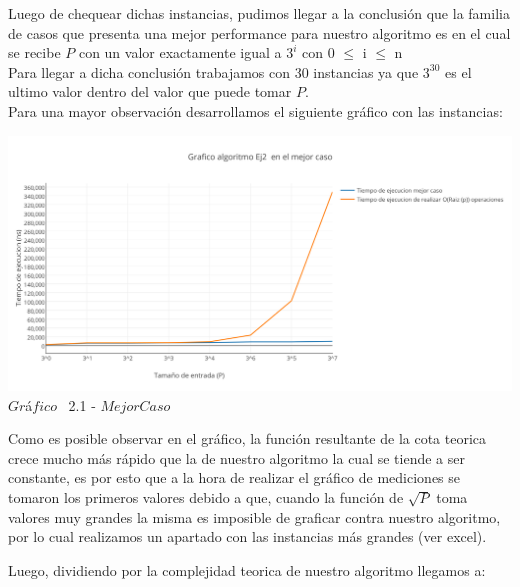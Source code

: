 Luego de chequear dichas instancias, pudimos llegar a la conclusi\'on que la familia de casos que presenta una mejor performance para nuestro algoritmo
es en el cual se recibe $P$ con un valor exactamente igual a $3^i$ con 0 $\leq$ i $\leq$ n \\

Para llegar a dicha conclusi\'on trabajamos con 30 instancias ya que $3^{30}$ es el ultimo valor dentro del valor que puede tomar $P$.\\

Para una mayor observaci\'on desarrollamos el siguiente gr\'afico con las instancias:\\

\vspace*{0.3cm} \vspace*{0.3cm}
  \begin{center}
 \includegraphics[scale=0.65]{./EJ2/mejorcaso.png}
 {$Gr$\'a$fico$ \ 2.1 - $Mejor Caso$}
  \end{center}
  \vspace*{0.3cm}
  
Como es posible observar en el gr\'afico, la funci\'on resultante de la cota teorica crece mucho m\'as r\'apido que la de nuestro algoritmo la cual se tiende a ser constante, es por esto que a la hora de realizar el gr\'afico de mediciones se tomaron los primeros valores debido a que, cuando la funci\'on de $\sqrt{P}$ toma valores muy grandes la misma es imposible de graficar contra nuestro algoritmo, por lo cual realizamos un apartado con las instancias m\'as grandes (ver excel).

Luego, dividiendo por la complejidad teorica de nuestro algoritmo llegamos a:\\

